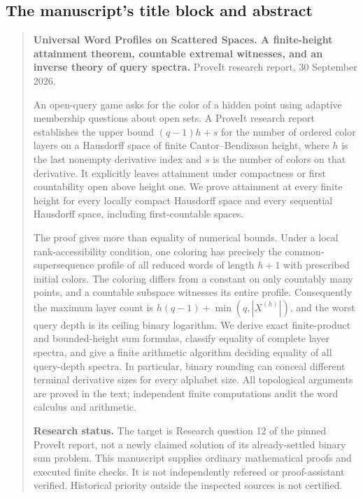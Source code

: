 \documentclass[11pt,letterpaper]{article}
\numberwithin{equation}{section}
\theoremstyle{definition}
\theoremstyle{remark}
\theoremstyle{definition}
\begin{document}
\subsection{The manuscript's title block and abstract}
\label{uw:sec:abstract}
\begin{quote}\small
\textbf{Universal Word Profiles on Scattered Spaces. A finite-height
attainment theorem, countable extremal witnesses, and an inverse theory of
query spectra.} ProveIt research report, 30 September 2026.

An open-query game asks for the color of a hidden point using adaptive
membership questions about open sets. A ProveIt research report establishes
the upper bound $(q-1)h+s$ for the number of ordered color layers on a
Hausdorff space of finite Cantor--Bendixson height, where $h$ is the last
nonempty derivative index and $s$ is the number of colors on that derivative.
It explicitly leaves attainment under compactness or first countability open
above height one. We prove attainment at every finite height for every locally
compact Hausdorff space and every sequential Hausdorff space, including
first-countable spaces.

The proof gives more than equality of numerical bounds. Under a local
rank-accessibility condition, one coloring has precisely the common-supersequence
profile of all reduced words of length $h+1$ with prescribed initial colors.
The coloring differs from a constant on only countably many points, and a
countable subspace witnesses its entire profile. Consequently the maximum
layer count is $h(q-1)+\min(q,|X^{(h)}|)$, and the worst query depth is its
ceiling binary logarithm. We derive exact finite-product and bounded-height
sum formulas, classify equality of complete layer spectra, and give a finite
arithmetic algorithm deciding equality of all query-depth spectra. In
particular, binary rounding can conceal different terminal derivative sizes
for every alphabet size. All topological arguments are proved in the text;
independent finite computations audit the word calculus and arithmetic.

\textbf{Research status.} The target is Research question 12 of the pinned
ProveIt report, not a newly claimed solution of its already-settled binary
sum problem. This manuscript supplies ordinary mathematical proofs and
executed finite checks. It is not independently refereed or proof-assistant
verified. Historical priority outside the inspected sources is not certified.
\end{quote}
\end{document}
